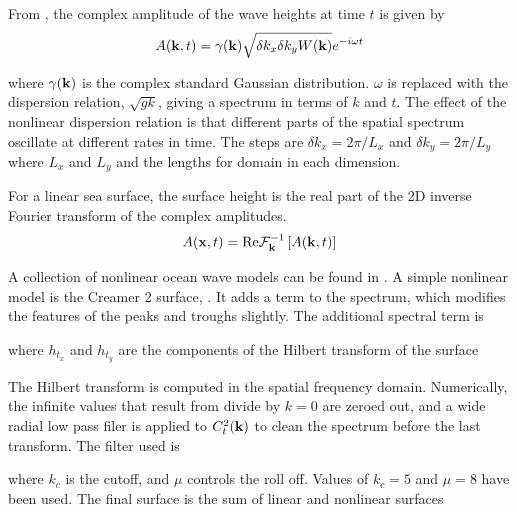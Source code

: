 From \cite{soriano2006doppler, niedzwecki1991comparative}, the complex amplitude of the wave heights at time $t$ is given by
\begin{equation}
A(\mathbf{k},t) = \gamma(\mathbf{k})\sqrt{\delta k_x \delta k_yW(\mathbf{k})} e^{-i\omega t}
\end{equation}

\noindent where $\gamma(\mathbf{k})$ is the complex standard Gaussian distribution.  $\omega$ is replaced with the dispersion relation, $\sqrt{gk}$, giving a spectrum in terms of $k$ and $t$. The effect of the nonlinear dispersion relation is that different parts of the spatial spectrum oscillate at different rates in time.  The steps are $\delta k_x = 2\pi/L_x$ and $\delta k_y = 2\pi/L_y$ where $L_x$ and $L_y$ and the lengths for domain in each dimension.   

For a linear sea surface, the surface height is the real part of the 2D inverse Fourier transform of the complex amplitudes.  
\begin{equation}
A(\mathbf{x},t) = \textrm{Re} \mathcal{F}_{\mathbf{k}}^{-1}\left[A(\mathbf{k},t)\right]
\end{equation}

A collection of nonlinear ocean wave models can be found in \cite{osborne2010nonlinear}.  A simple nonlinear model is the Creamer 2 surface, \cite{soriano2006doppler}. It adds a term to the spectrum, which modifies the features of the peaks and troughs slightly. The additional spectral term is 

\noindent where $h_{t_x}$ and $h_{t_y}$ are the components of the Hilbert transform of the surface

The Hilbert transform is computed in the spatial frequency domain.  Numerically, the infinite values that result from divide by $k=0$ are zeroed out, and a wide radial low pass filer is applied to $C_t^2(\mathbf{k})$ to clean the spectrum before the last transform.  The filter used is 

\noindent where $k_c$ is the cutoff, and $\mu$ controls the roll off.  Values of $k_c = 5$ and $\mu = 8$ have been used.  The final surface is the sum of linear and nonlinear surfaces


